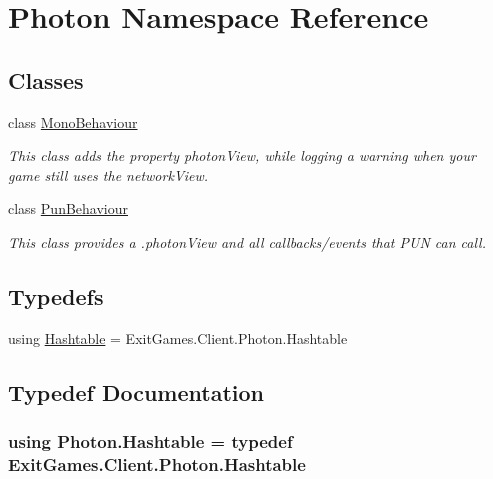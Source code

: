\hypertarget{namespace_photon}{}\section{Photon Namespace Reference}
\label{namespace_photon}
\subsection*{Classes}
\begin{DoxyCompactItemize}
\item 
class \hyperlink{class_photon_1_1_mono_behaviour}{Mono\+Behaviour}
\begin{DoxyCompactList}\small\item\em This class adds the property photon\+View, while logging a warning when your game still uses the network\+View. \end{DoxyCompactList}\item 
class \hyperlink{class_photon_1_1_pun_behaviour}{Pun\+Behaviour}
\begin{DoxyCompactList}\small\item\em This class provides a .photon\+View and all callbacks/events that P\+UN can call. \end{DoxyCompactList}\end{DoxyCompactItemize}
\subsection*{Typedefs}
\begin{DoxyCompactItemize}
\item 
using \hyperlink{namespace_photon_ac2f4b49a218ef814d00e31cd5f32bf4e}{Hashtable} = Exit\+Games.\+Client.\+Photon.\+Hashtable
\end{DoxyCompactItemize}


\subsection{Typedef Documentation}
\subsubsection[{\texorpdfstring{Hashtable}{Hashtable}}]{\setlength{\rightskip}{0pt plus 5cm}using {\bf Photon.\+Hashtable} = typedef Exit\+Games.\+Client.\+Photon.\+Hashtable}\hypertarget{namespace_photon_ac2f4b49a218ef814d00e31cd5f32bf4e}{}\label{namespace_photon_ac2f4b49a218ef814d00e31cd5f32bf4e}
